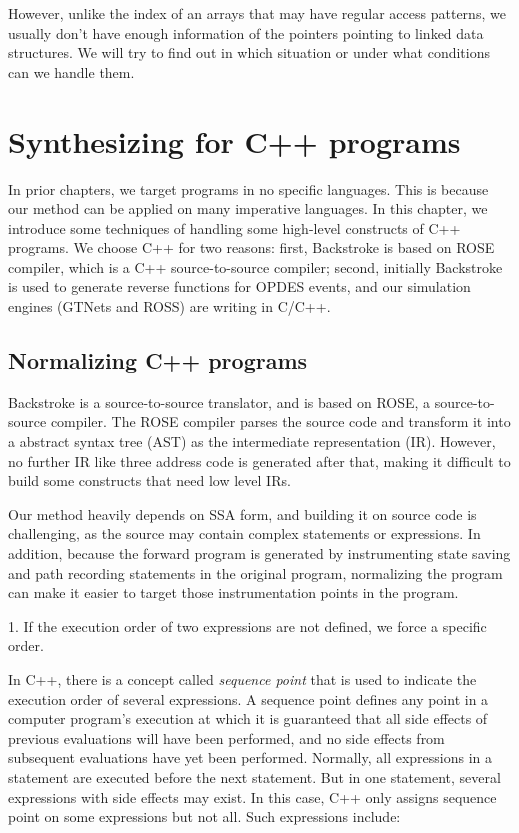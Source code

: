 \documentclass[12pt]{gatech-thesis}
\begin{document}
However, unlike the index of an arrays that may have regular access patterns, we usually don't have enough information of the pointers pointing to linked data structures. 
We will try to find out in which situation or under what conditions can we handle them.




\chapter{Synthesizing for C++ programs}

In prior chapters, we target programs in no specific languages.
This is because our method can be applied on many imperative languages.
In this chapter, we introduce some techniques of handling some high-level constructs of C++ programs. 
We choose C++ for two reasons: first, Backstroke is based on ROSE compiler, which is a C++ source-to-source compiler; second, initially Backstroke is used to generate reverse functions for OPDES events, and our  simulation engines (GTNets and ROSS) are writing in C/C++.

\section{Normalizing C++ programs}

Backstroke is a source-to-source translator, and is based on ROSE,  a source-to-source compiler. 
The ROSE compiler parses the source code and transform it into a abstract syntax tree (AST) as the intermediate representation (IR).
However, no further IR like three address code is generated after that, making it difficult to build some constructs that need low level IRs. 

Our method heavily depends on SSA form, and building it on source code is challenging, as the source may contain complex statements or expressions.
In addition, because the forward program is generated by instrumenting state saving and path recording statements in the original program, normalizing the program can make it easier to target those instrumentation points in the program. 

1. If the execution order of two expressions are not defined, we force a specific order.

In C++, there is a concept called \emph{sequence point} that is used to indicate the execution order of several expressions. 
A sequence point defines any point in a computer program's execution at which it is guaranteed that all side effects of previous evaluations will have been performed, and no side effects from subsequent evaluations have yet been performed.
Normally, all expressions in a statement are executed before the next statement. 
But in one statement, several expressions with side effects may exist. 
In this case, C++ only assigns sequence point on some expressions but not all.
Such expressions include:
\end{document}
